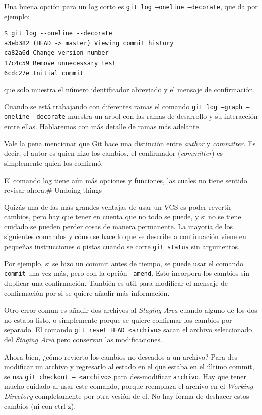 \documentclass[spanish, 12pt, a4paper]{article}
\begin{document}
Una buena opción para un log corto es
\passthrough{\lstinline!git log –oneline –decorate!}, que da por
ejemplo:

\begin{lstlisting}
$ git log --oneline --decorate
a3eb382 (HEAD -> master) Viewing commit history
ca82a6d Change version number
17c4c59 Remove unnecessary test
6cdc27e Initial commit
\end{lstlisting}

que solo muestra el número identificador abreviado y el mensaje de
confirmación.

Cuando se está trabajando con diferentes ramas el comando
\passthrough{\lstinline!git log –graph –oneline –decorate!} muestra un
arbol con las ramas de desarrollo y su interacción entre ellas.
Hablaremos con más detalle de ramas más adelante.

Vale la pena mencionar que Git hace una distinción entre \emph{author} y
\emph{committer}. Es decir, el autor es quien hizo los cambios, el
confirmador (\emph{committer}) es simplemente quien los confirmó.

El comando log tiene aún más opciones y funciones, las cuales no tiene
sentido revisar ahora.\# Undoing things

Quizás una de las más grandes ventajas de usar un VCS es poder revertir
cambios, pero hay que tener en cuenta que no todo se puede, y si no se
tiene cuidado se pueden perder cosas de manera permanente. La mayoría de
los siguientes comandos y cómo se hace lo que se describe a continuación
viene en pequeñas instrucciones o pistas cuando se corre
\passthrough{\lstinline!git status!} sin argumentos.

Por ejemplo, si se hizo un commit antes de tiempo, se puede usar el
comando \passthrough{\lstinline!commit!} una vez más, pero con la opción
\passthrough{\lstinline!–amend!}. Esto incorpora los cambios sin
duplicar una confirmación. También es util para modificar el mensaje de
confirmación por si se quiere añadir más información.

Otro error comun es añadir dos archivos al \emph{Staging Area} cuando
alguno de los dos no estaba listo, o simplemente porque se quiere
confirmar los cambios por separado. El comando
\passthrough{\lstinline!git reset HEAD <archivo>!} sacan el archivo
seleccionado del \emph{Staging Area} pero conservan las modificaciones.

Ahora bien, ¿cómo revierto los cambios no deseados a un archivo? Para
des-modificar un archivo y regresarlo al estado en el que estaba en el
último commit, se usa \passthrough{\lstinline!git checkout – <archivo>!}
para des-modificar \passthrough{\lstinline!archivo!}. Hay que tener
mucho cuidado al usar este comando, porque reemplaza el archivo en el
\emph{Working Directory} completamente por otra vesión de el. No hay
forma de deshacer estos cambios (ni con ctrl-z).
\end{document}
